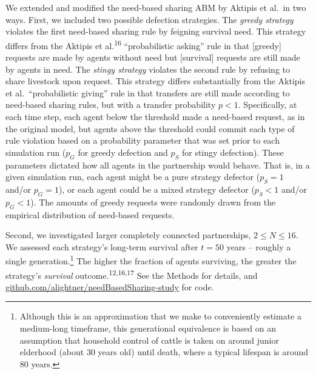 \documentclass[
]{article}
\begin{document}
We extended and modified the need-based sharing ABM by Aktipis et al.~in two ways. First, we included two possible defection strategies. The \emph{greedy strategy} violates the first need-based sharing rule by feigning survival need. This strategy differs from the Aktipis et al.\textsuperscript{16} ``probabilistic asking'' rule in that {[}greedy{]} requests are made by agents without need but {[}survival{]} requests are still made by agents in need. The \emph{stingy strategy} violates the second rule by refusing to share livestock upon request. This strategy differs substantially from the Aktipis et al.~``probabilistic giving'' rule in that transfers are still made according to need-based sharing rules, but with a transfer probability \(p<1\). Specifically, at each time step, each agent below the threshold made a need-based request, as in the original model, but agents above the threshold could commit each type of rule violation based on a probability parameter that was set prior to each simulation run (\(p_G\) for greedy defection and \(p_S\) for stingy defection). These parameters dictated how all agents in the partnership would behave. That is, in a given simulation run, each agent might be a pure strategy defector (\(p_S=1\) and/or \(p_G=1\)), or each agent could be a mixed strategy defector (\(p_S<1\) and/or \(p_G<1\)). The amounts of greedy requests were randomly drawn from the empirical distribution of need-based requests.

Second, we investigated larger completely connected partnerships, \(2 \le N \le 16\). We assessed each strategy's long-term survival after \(t=50\) years -- roughly a single generation.\footnote{Although this is an approximation that we make to conveniently estimate a medium-long timeframe, this generational equivalence is based on an assumption that household control of cattle is taken on around junior elderhood (about 30 years old) until death, where a typical lifespan is around 80 years.} The higher the fraction of agents surviving, the greater the strategy's \emph{survival} outcome.\textsuperscript{12,16,17} See the Methods for details, and \href{https://github.com/alightner/needBasedSharing-study}{github.com/alightner/needBasedSharing-study} for code.
\end{document}
